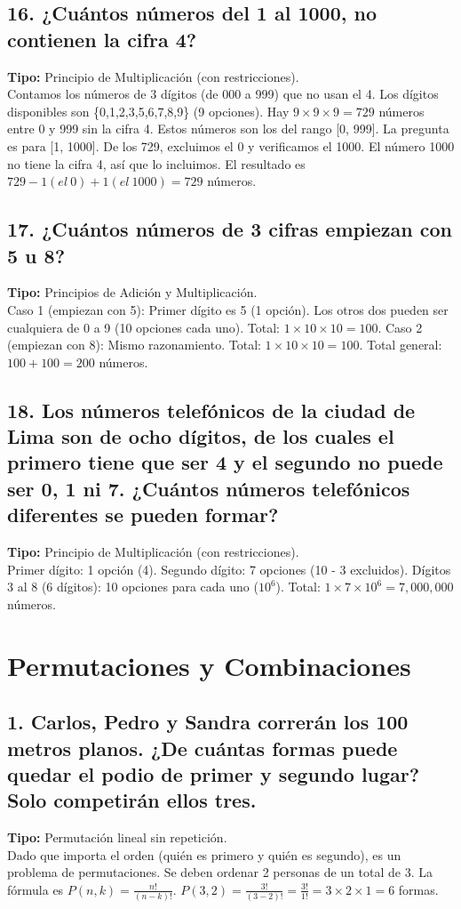 \documentclass[11pt]{article}
\begin{document}
    \subsection*{16. ¿Cuántos números del 1 al 1000, no contienen la cifra 4?}
    \textbf{Tipo:} Principio de Multiplicación (con restricciones). \\
    Contamos los números de 3 dígitos (de 000 a 999) que no usan el 4. Los dígitos disponibles son \{0,1,2,3,5,6,7,8,9\} (9 opciones).
    Hay $9 \times 9 \times 9 = 729$ números entre 0 y 999 sin la cifra 4.
    Estos números son los del rango [0, 999]. La pregunta es para [1, 1000]. De los 729, excluimos el 0 y verificamos el 1000. El número 1000 no tiene la cifra 4, así que lo incluimos. El resultado es $729 - 1 (el \: 0) + 1 (el \: 1000) = 729$ números.

    \subsection*{17. ¿Cuántos números de 3 cifras empiezan con 5 u 8?}
    \textbf{Tipo:} Principios de Adición y Multiplicación. \\
    Caso 1 (empiezan con 5): Primer dígito es 5 (1 opción). Los otros dos pueden ser cualquiera de 0 a 9 (10 opciones cada uno). Total: $1 \times 10 \times 10 = 100$.
    Caso 2 (empiezan con 8): Mismo razonamiento. Total: $1 \times 10 \times 10 = 100$.
    Total general: $100 + 100 = 200$ números.

    \subsection*{18. Los números telefónicos de la ciudad de Lima son de ocho dígitos, de los cuales el primero tiene que ser 4 y el segundo no puede ser 0, 1 ni 7. ¿Cuántos números telefónicos diferentes se pueden formar?}
    \textbf{Tipo:} Principio de Multiplicación (con restricciones). \\
    Primer dígito: 1 opción (4).
    Segundo dígito: 7 opciones (10 - 3 excluidos).
    Dígitos 3 al 8 (6 dígitos): 10 opciones para cada uno ($10^6$).
    Total: $1 \times 7 \times 10^6 = 7,000,000$ números.

\newpage

\section{Permutaciones y Combinaciones}
    \subsection*{1. Carlos, Pedro y Sandra correrán los 100 metros planos. ¿De cuántas formas puede quedar el podio de primer y segundo lugar? Solo competirán ellos tres.}
    \textbf{Tipo:} Permutación lineal sin repetición. \\
    Dado que importa el orden (quién es primero y quién es segundo), es un problema de permutaciones. Se deben ordenar 2 personas de un total de 3.
    La fórmula es $P(n,k) = \frac{n!}{(n-k)!}$.
    $P(3,2) = \frac{3!}{(3-2)!} = \frac{3!}{1!} = 3 \times 2 \times 1 = 6$ formas.
\end{document}
